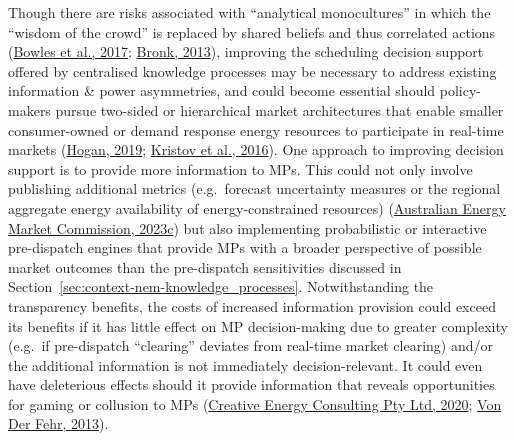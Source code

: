 \documentclass[12pt,a4paper,]{report}
\begin{document}
Though there are risks associated with ``analytical monocultures'' in
which the ``wisdom of the crowd'' is replaced by shared beliefs and thus
correlated actions
(\protect\hyperlink{ref-bowlesRetrospectivesFriedrichHayek2017}{Bowles
et al., 2017}; \protect\hyperlink{ref-bronkHayekWisdomPrices2013}{Bronk,
2013}), improving the scheduling decision support offered by centralised
knowledge processes may be necessary to address existing information \&
power asymmetries, and could become essential should policy-makers
pursue two-sided or hierarchical market architectures that enable
smaller consumer-owned or demand response energy resources to
participate in real-time markets
(\protect\hyperlink{ref-hoganMarketDesignPractices2019}{Hogan, 2019};
\protect\hyperlink{ref-kristovTaleTwoVisions2016}{Kristov et al.,
2016}). One approach to improving decision support is to provide more
information to MPs. This could not only involve publishing additional
metrics (e.g.~forecast uncertainty measures or the regional aggregate
energy availability of energy-constrained resources)
(\protect\hyperlink{ref-australianenergymarketcommissionOperatingReserveMarket2023}{Australian
Energy Market Commission, 2023c}) but also implementing probabilistic or
interactive pre-dispatch engines that provide MPs with a broader
perspective of possible market outcomes than the pre-dispatch
sensitivities discussed in
Section~\ref{sec:context-nem-knowledge_processes}. Notwithstanding the
transparency benefits, the costs of increased information provision
could exceed its benefits if it has little effect on MP decision-making
due to greater complexity (e.g.~if pre-dispatch ``clearing'' deviates
from real-time market clearing) and/or the additional information is not
immediately decision-relevant. It could even have deleterious effects
should it provide information that reveals opportunities for gaming or
collusion to MPs
(\protect\hyperlink{ref-creativeenergyconsultingptyltdSchedulingAheadMarkets2020}{Creative
Energy Consulting Pty Ltd, 2020};
\protect\hyperlink{ref-vonderfehrTransparencyElectricityMarkets2013}{Von
Der Fehr, 2013}).
\end{document}
